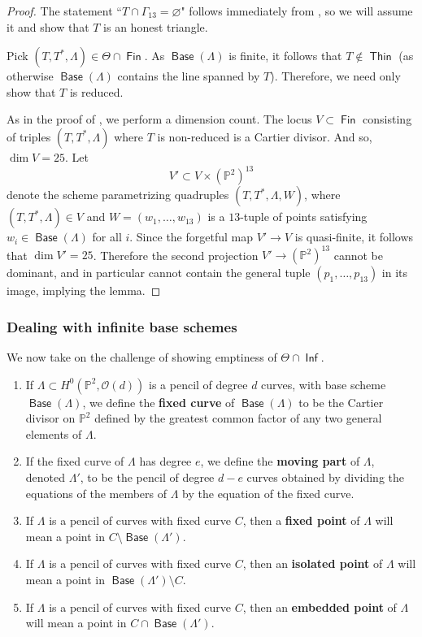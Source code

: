 \documentclass{article}
\renewcommand{\P}{\mathbb{P}}
\renewcommand{\O}{\mathcal{O}}
\DeclareMathOperator{\Thin}{\mathsf{Thin}}
\DeclareMathOperator{\Inf}{\mathsf{Inf}}
\DeclareMathOperator{\Fin}{\mathsf{Fin}}
\DeclareMathOperator{\Base}{\mathsf{Base}}
\begin{document}
\begin{proof}
  The statement ``$T \cap \Gamma_{13} = \varnothing$" follows
  immediately from , so we will assume it and
  show that $T$ is an honest triangle.

  Pick $(T,T^{*},\Lambda) \in \Theta \cap \Fin$. As $\Base(\Lambda)$ is
  finite, it follows that $T \notin \Thin$ (as otherwise $\Base(\Lambda)$
  contains the line spanned by $T$). Therefore, we need only show that $T$ is reduced.
  
  As in the proof of , we perform a
  dimension count.  The locus $V \subset \Fin$ consisting of triples
  $(T,T^{*},\Lambda)$ where $T$ is non-reduced is a Cartier
  divisor. And so, $\dim V = 25$. Let
  \[V' \subset V \times (\P^{2})^{13}\] denote the scheme
  parametrizing quadruples $(T,T^{*},\Lambda, W)$, where
  $(T,T^{*},\Lambda) \in V$ and $W = (w_1, \dots, w_{13})$ is a 
  $13$-tuple of points satisfying $w_{i} \in \Base(\Lambda)$ for all
  $i$. Since the forgetful map $V' \to V$ is quasi-finite, it follows
  that $\dim V' = 25$. Therefore the second projection
  $V' \to (\P^{2})^{13}$ cannot be dominant, and in particular cannot
  contain the general tuple $(p_1,\dots, p_{13})$ in its image, implying the lemma.
\end{proof}

\subsubsection{Dealing with infinite base schemes}
\label{sec:inf-considerations}



We now take on the challenge of showing emptiness of $\Theta \cap \Inf$.


\begin{definition}
  \label{definition:1dpart} 
  \begin{enumerate}
    \item If $\Lambda \subset H^{0}(\P^2, \O(d))$ is
    a pencil of degree $d$ curves, with base scheme $\Base(\Lambda)$, we
    define the {\bf fixed curve} of $\Base(\Lambda)$ to be the Cartier
    divisor on $\P^{2}$ defined by the greatest common factor of any two
    general elements of $\Lambda$. 
    \item If the fixed curve of $\Lambda$ has
    degree $e$, we define the {\bf moving part} of $\Lambda$, denoted $\Lambda'$, to be the
    pencil of degree $d-e$ curves obtained by dividing the equations of
    the members of $\Lambda$ by the equation of the fixed curve.
    \item If $\Lambda$ is a pencil of curves with fixed curve $C$, then a {\bf fixed point} of $\Lambda$ will mean a point in $C \setminus \Base(\Lambda')$.
    \item If $\Lambda$ is a pencil of curves with fixed curve $C$, then an {\bf isolated point} of $\Lambda$ will mean a point in $\Base(\Lambda') \setminus C$.
    \item If $\Lambda$ is a pencil of curves with fixed curve $C$, then an {\bf embedded point} of $\Lambda$ will mean a point in $C \cap \Base(\Lambda')$.
  \end{enumerate}
\end{definition}
\end{document}
